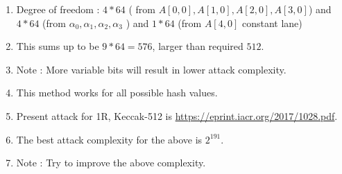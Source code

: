 \documentclass{article}
\begin{document}
\begin{enumerate}
    \item Degree of freedom : $4*64$ ( from  $A[0,0], A[1,0], A[2,0], A[3,0]$) and $4*64$ (from $\alpha_0, \alpha_1, \alpha_2, \alpha_3$ ) and $1*64$ (from $A[4,0]$ constant lane)
    \item This sums up to be $9*64 = 576$, larger than required $512$.
    \item Note : More variable bits will result in lower attack complexity.
    \item This method works for all possible hash values.
    \item Present attack for 1R, Keccak-512 is \url{https://eprint.iacr.org/2017/1028.pdf}.
    \item The best attack complexity for the above is $2^{191}$.
    \item Note : Try to improve the above complexity.
\end{enumerate}
\end{document}
